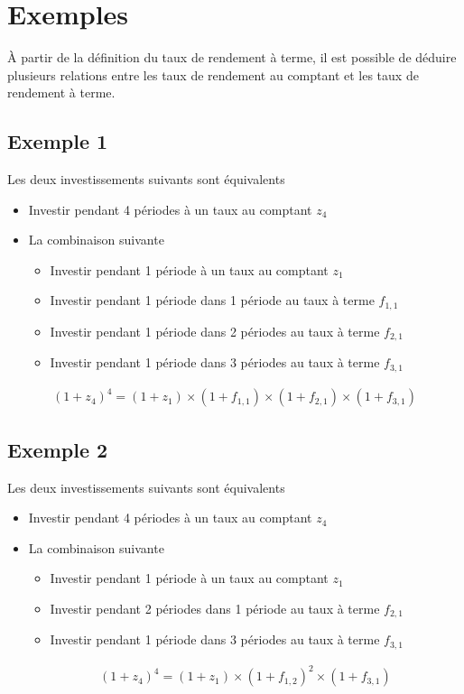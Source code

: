 \documentclass[letterpaper, 12pt]{article}
\newcommand{\1}{\mathds{1}}	%
\theoremstyle{definition}
\begin{document}
\section{Exemples}
À partir de la définition du taux de rendement à terme,  il est possible de déduire plusieurs relations entre les taux de rendement au comptant et les taux de rendement à terme.

\subsection{Exemple 1}
Les deux investissements suivants sont équivalents
\begin{itemize}
\item Investir pendant 4 périodes à un taux au comptant $z_4$
\item La combinaison suivante
\begin{itemize}
\item Investir pendant 1 période à un taux au comptant $z_1$
\item Investir pendant 1 période dans 1 période au taux à terme $f_{1,1}$
\item Investir pendant 1 période dans 2 périodes au taux à terme $f_{2,1}$
\item Investir pendant 1 période dans 3 périodes au taux à terme $f_{3,1}$
\end{itemize}
\end{itemize}
\begin{align*}
(1+z_4)^4=(1+z_1) \times (1+f_{1,1}) \times (1+f_{2,1}) \times (1+f_{3,1})
\end{align*}


\subsection{Exemple 2}
Les deux investissements suivants sont équivalents
\begin{itemize}
\item Investir pendant 4 périodes à un taux au comptant $z_4$
\item La combinaison suivante
\begin{itemize}
\item Investir pendant 1 période à un taux au comptant $z_1$
\item Investir pendant 2 périodes dans 1 période au taux à terme $f_{2,1}$
\item Investir pendant 1 période dans 3 périodes au taux à terme $f_{3,1}$
\end{itemize}

\begin{align*}
(1+z_4)^4=(1+z_1) \times (1+f_{1,2})^2 \times (1+f_{3,1})
\end{align*}
\end{itemize}
\end{document}
